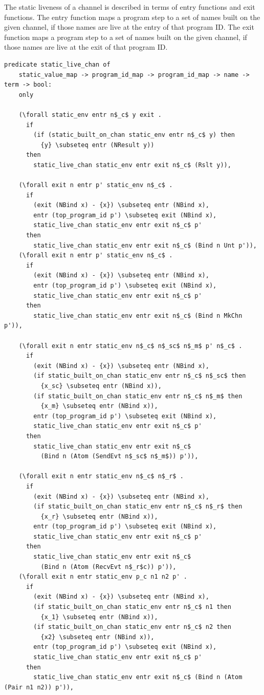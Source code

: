\documentclass[10pt]{article}
\begin{document}
The static liveness of a channel is described in terms of entry functions and
exit functions. The entry function maps a program step to a set of names built on
the given channel, if those names are live at the entry of that program ID.
The exit function maps a program step to a
set of names built on the given channel, if those names are live at the exit of that
program ID.

\begin{lstlisting}[language=logic, mathescape]
  predicate static_live_chan of
    static_value_map -> program_id_map -> program_id_map -> name -> term -> bool:
    only

    (\forall static_env entr n$_c$ y exit .
      if
        (if (static_built_on_chan static_env entr n$_c$ y) then
          {y} \subseteq entr (NResult y))
      then
        static_live_chan static_env entr exit n$_c$ (Rslt y)),

    (\forall exit n entr p' static_env n$_c$ .
      if 
        (exit (NBind x) - {x}) \subseteq entr (NBind x),
        entr (top_program_id p') \subseteq exit (NBind x),
        static_live_chan static_env entr exit n$_c$ p'
      then 
        static_live_chan static_env entr exit n$_c$ (Bind n Unt p')),
    (\forall exit n entr p' static_env n$_c$ .
      if
        (exit (NBind x) - {x}) \subseteq entr (NBind x),
        entr (top_program_id p') \subseteq exit (NBind x),
        static_live_chan static_env entr exit n$_c$ p'
      then 
        static_live_chan static_env entr exit n$_c$ (Bind n MkChn p')),

    (\forall exit n entr static_env n$_c$ n$_sc$ n$_m$ p' n$_c$ .
      if
        (exit (NBind x) - {x}) \subseteq entr (NBind x),
        (if static_built_on_chan static_env entr n$_c$ n$_sc$ then
          {x_sc} \subseteq entr (NBind x)),
        (if static_built_on_chan static_env entr n$_c$ n$_m$ then 
          {x_m} \subseteq entr (NBind x)),
        entr (top_program_id p') \subseteq exit (NBind x),
        static_live_chan static_env entr exit n$_c$ p'
      then
        static_live_chan static_env entr exit n$_c$
          (Bind n (Atom (SendEvt n$_sc$ n$_m$)) p')),

    (\forall exit n entr static_env n$_c$ n$_r$ .    
      if
        (exit (NBind x) - {x}) \subseteq entr (NBind x),
        (if static_built_on_chan static_env entr n$_c$ n$_r$ then
          {x_r} \subseteq entr (NBind x)),
        entr (top_program_id p') \subseteq exit (NBind x),
        static_live_chan static_env entr exit n$_c$ p'
      then
        static_live_chan static_env entr exit n$_c$
          (Bind n (Atom (RecvEvt n$_r$c)) p')),
    (\forall exit n entr static_env p_c n1 n2 p' .
      if
        (exit (NBind x) - {x}) \subseteq entr (NBind x),
        (if static_built_on_chan static_env entr n$_c$ n1 then
          {x_1} \subseteq entr (NBind x)),
        (if static_built_on_chan static_env entr n$_c$ n2 then
          {x2} \subseteq entr (NBind x)),
        entr (top_program_id p') \subseteq exit (NBind x),
        static_live_chan static_env entr exit n$_c$ p'
      then
        static_live_chan static_env entr exit n$_c$ (Bind n (Atom (Pair n1 n2)) p')),


\end{lstlisting}
\end{document}
